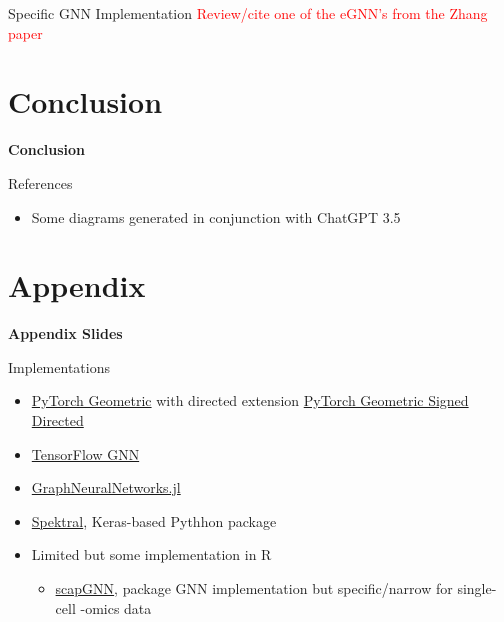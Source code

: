 \documentclass{beamer}
\begin{document}
\begin{frame}{Specific GNN Implementation}
    \textcolor{red}{Review/cite one of the eGNN's from the Zhang paper}
\end{frame}



\section*{Conclusion}

\begin{frame}{}
    \bf{\LARGE Conclusion}    
\end{frame}



\begin{frame}[allowframebreaks]{References}
    \begin{itemize}
    \item Some diagrams generated in conjunction with ChatGPT 3.5
    \end{itemize}
    \printbibliography 
\end{frame}



\section*{Appendix}

\begin{frame}{}
\bf{\LARGE Appendix Slides}    
\end{frame}

\begin{frame}{Implementations}
    \begin{itemize}
        \item \href{https://pytorch-geometric.readthedocs.io/en/latest/}{PyTorch Geometric} with directed extension \href{https://github.com/SherylHYX/pytorch_geometric_signed_directed}{PyTorch Geometric Signed Directed}
        \item \href{https://github.com/tensorflow/gnn}{TensorFlow GNN} \cite{ferludin_tf-gnn_2023}
        \item \href{https://carlolucibello.github.io/GraphNeuralNetworks.jl/dev/}{GraphNeuralNetworks.jl}
        \item \href{https://graphneural.network/}{Spektral}, Keras-based Pythhon package 
        \item Limited but some implementation in R 
        \begin{itemize}
            \item \href{https://cran.r-project.org/web/packages/scapGNN/vignettes/vignette.html}{scapGNN}, package GNN implementation but specific/narrow for single-cell -omics data 
        \end{itemize}
    \end{itemize}
\end{frame}
\end{document}
